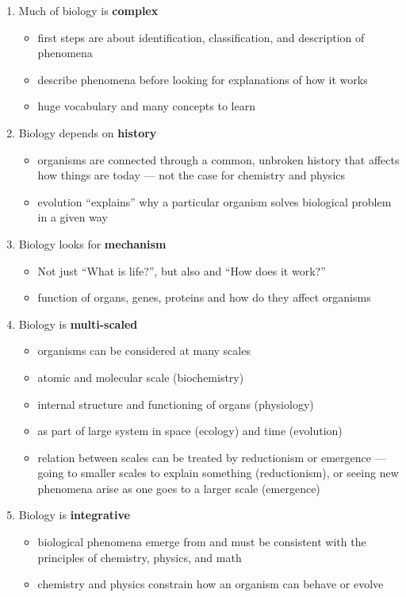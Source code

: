 \begin{enumerate}
\item Much of biology is {\bf complex}
  \begin{itemize}
    \item first steps are about identification, classification, and description of phenomena
    \item describe phenomena before looking for explanations of how it works
    \item huge vocabulary and many concepts to learn
  \end{itemize}

\item Biology depends on {\bf history}
  \begin{itemize}
  \item organisms are connected through a common, unbroken history that affects how things are today --- not the case for chemistry and physics
    \item evolution ``explains'' why a particular organism solves biological problem in a given way
  \end{itemize}
  
\item  Biology looks for {\bf mechanism}
  \begin{itemize}
    \item Not just ``What is life?'', but also and ``How does it work?''
    \item function of organs, genes, proteins and how do they affect organisms
  \end{itemize}
  
\item Biology is {\bf multi-scaled}
  \begin{itemize}
    \item organisms can be considered at many scales
    \item atomic and molecular scale (biochemistry)
    \item internal structure and functioning of organs (physiology)
    \item as part of large system in space (ecology) and time (evolution)
    \item relation between scales can be treated by reductionism or emergence --- going to smaller scales to explain something (reductionism), or seeing new phenomena arise as one goes to a larger scale (emergence)
  \end{itemize}
  
\item Biology is {\bf integrative}
  \begin{itemize}
   \item biological phenomena emerge from and must be consistent with the principles of chemistry, physics, and math
   \item chemistry and physics constrain how an organism can behave or evolve  
  \end{itemize}
\end{enumerate} 

